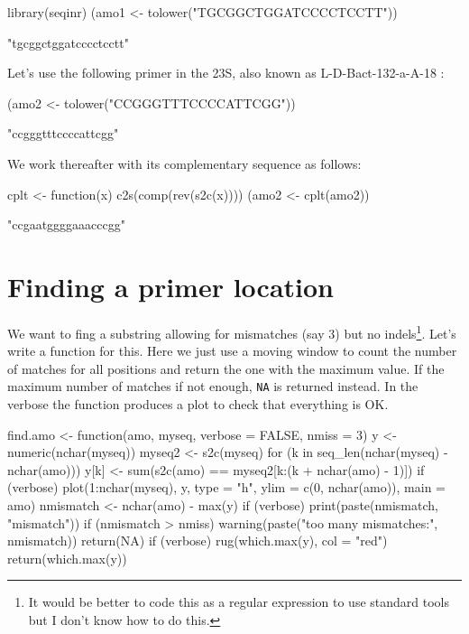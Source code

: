 \documentclass{article}
\begin{document}
\begin{Schunk}
\begin{Sinput}
 library(seqinr)
 (amo1 <- tolower("TGCGGCTGGATCCCCTCCTT"))
\end{Sinput}
\begin{Soutput}
[1] "tgcggctggatcccctcctt"
\end{Soutput}
\end{Schunk}


Let's use the following primer in the 23S, also known as 
L-D-Bact-132-a-A-18 \cite{RanjardL2000}:

\begin{Schunk}
\begin{Sinput}
 (amo2 <- tolower("CCGGGTTTCCCCATTCGG"))
\end{Sinput}
\begin{Soutput}
[1] "ccgggtttccccattcgg"
\end{Soutput}
\end{Schunk}

We work thereafter with its complementary sequence as follows:

\begin{Schunk}
\begin{Sinput}
 cplt <- function(x) c2s(comp(rev(s2c(x))))
 (amo2 <- cplt(amo2))
\end{Sinput}
\begin{Soutput}
[1] "ccgaatggggaaacccgg"
\end{Soutput}
\end{Schunk}

\section{Finding a primer location}

We want to fing a substring allowing for mismatches (say 3)
but no indels\footnote{It would be better to code this as
a regular expression to use standard tools but I don't know how 
to do this.}. Let's
write a function for this. Here we just use a moving window to count the
number of matches for all positions and return the one with the
maximum value. If the maximum number of matches if not enough, \texttt{NA}
is returned instead. In the verbose the function produces a plot
to check that everything is OK.

\begin{Schunk}
\begin{Sinput}
 find.amo <- function(amo, myseq, verbose = FALSE, nmiss = 3) {
     y <- numeric(nchar(myseq))
     myseq2 <- s2c(myseq)
     for (k in seq_len(nchar(myseq) - nchar(amo))) {
         y[k] <- sum(s2c(amo) == myseq2[k:(k + nchar(amo) - 
             1)])
     }
     if (verbose) 
         plot(1:nchar(myseq), y, type = "h", ylim = c(0, nchar(amo)), 
             main = amo)
     nmismatch <- nchar(amo) - max(y)
     if (verbose) 
         print(paste(nmismatch, "mismatch"))
     if (nmismatch > nmiss) {
         warning(paste("too many mismatches:", nmismatch))
         return(NA)
     }
     if (verbose) 
         rug(which.max(y), col = "red")
     return(which.max(y))
 }
\end{Sinput}
\end{Schunk}
\end{document}
